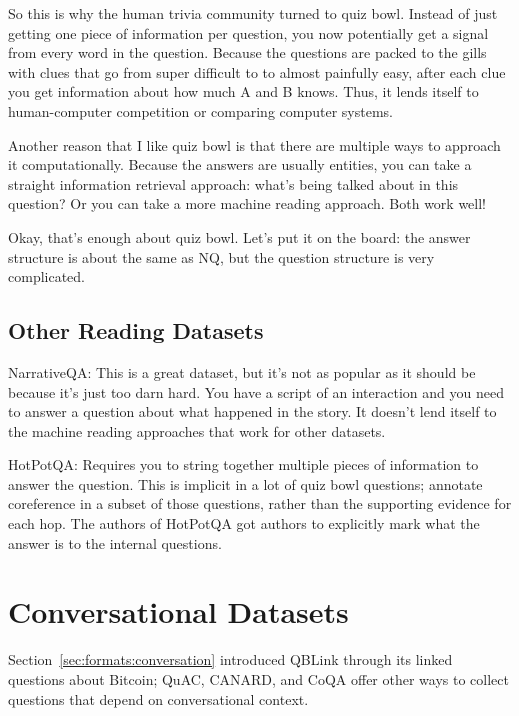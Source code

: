 So this is why the human trivia community turned to quiz bowl. Instead of just getting one piece of information per question, you now potentially get a signal from every word in the question. Because the questions are packed to the gills with clues that go from super difficult to to almost painfully easy, after each clue you get information about how much A and B knows. Thus, it lends itself to human-computer competition or comparing computer systems.

Another reason that I like quiz bowl is that there are multiple ways to approach it computationally. Because the answers are usually entities, you can take a straight information retrieval approach: what’s being talked about in this question? Or you can take a more machine reading approach. Both work well!

Okay, that’s enough about quiz bowl. Let’s put it on the board: the answer structure is about the same as NQ, but the question structure is very complicated.


\subsection{Other Reading Datasets}

NarrativeQA: This is a great dataset, but it’s not as popular as it should be because it’s just too darn hard. You have a script of an interaction and you need to answer a question about what happened in the story. It doesn’t lend itself to the machine reading approaches that work for other datasets.

HotPotQA: Requires you to string together multiple pieces of information to answer the question. This is implicit in a lot of quiz bowl questions; \citet{Guha-15} annotate coreference in a subset of those questions, rather than the supporting evidence for each hop. The authors of HotPotQA got authors to explicitly mark what the answer is to the internal questions.

\section{Conversational Datasets}
\label{sec:datasets:conversation}

Section~\ref{sec:formats:conversation} introduced QBLink through its linked questions about Bitcoin; QuAC, CANARD, and CoQA offer other ways to collect questions that depend on conversational context.

